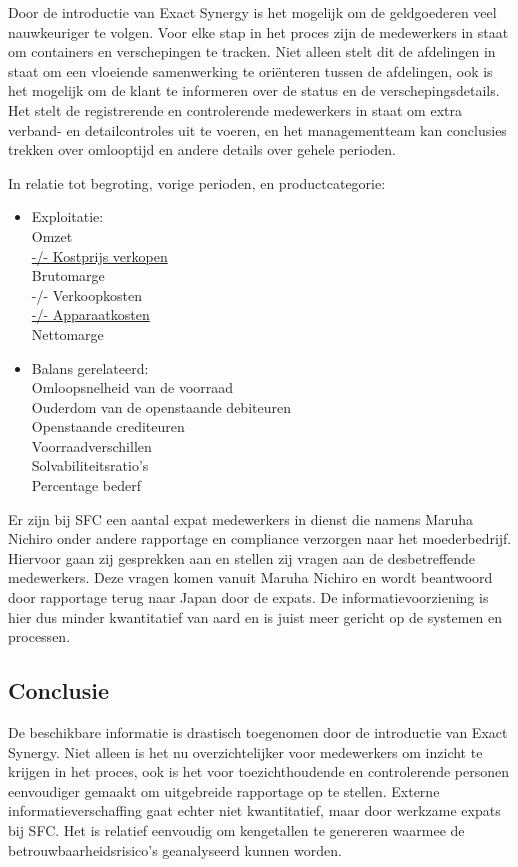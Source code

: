 \newpage 
Door de introductie van Exact Synergy is het mogelijk om de \gls{geldgoederen} veel nauwkeuriger te volgen. Voor elke stap in het proces zijn de medewerkers in staat om containers en verschepingen te tracken. Niet alleen stelt dit de afdelingen in staat om een vloeiende samenwerking te oriënteren tussen de afdelingen, ook is het mogelijk om de klant te informeren over de status en de verschepingsdetails. Het stelt de registrerende en controlerende medewerkers in staat om extra verband- en detailcontroles uit te voeren, en het managementteam kan conclusies trekken over omlooptijd en andere details over gehele perioden. \citep{aoibsfc}

In relatie tot begroting, vorige perioden, en productcategorie:
\begin{itemize}
    \item Exploitatie: \\
    Omzet \\
    \underline{-/- Kostprijs verkopen} \\
    Brutomarge \\
    -/- Verkoopkosten \\
    \underline{-/- Apparaatkosten} \\
    Nettomarge \\
    \item Balans gerelateerd: \\
    Omloopsnelheid van de voorraad \\
    Ouderdom van de openstaande debiteuren \\
    Openstaande crediteuren \\
    Voorraadverschillen \\
    Solvabiliteitsratio's \\
    Percentage bederf
\end{itemize}

Er zijn bij SFC een aantal expat medewerkers in dienst die namens Maruha Nichiro onder andere rapportage en compliance verzorgen naar het moederbedrijf. Hiervoor gaan zij gesprekken aan en stellen zij vragen aan de desbetreffende medewerkers. Deze vragen komen vanuit Maruha Nichiro en wordt beantwoord door rapportage terug naar Japan door de expats. De informatievoorziening is hier dus minder kwantitatief van aard en is juist meer gericht op de systemen en processen.

\subsection*{Conclusie}
De beschikbare informatie is drastisch toegenomen door de introductie van Exact Synergy. Niet alleen is het nu overzichtelijker voor medewerkers om inzicht te krijgen in het proces, ook is het voor toezichthoudende en controlerende personen eenvoudiger gemaakt om uitgebreide rapportage op te stellen. Externe informatieverschaffing gaat echter niet kwantitatief, maar door werkzame expats bij SFC. Het is relatief eenvoudig om kengetallen te genereren waarmee de betrouwbaarheidsrisico's geanalyseerd kunnen worden.


